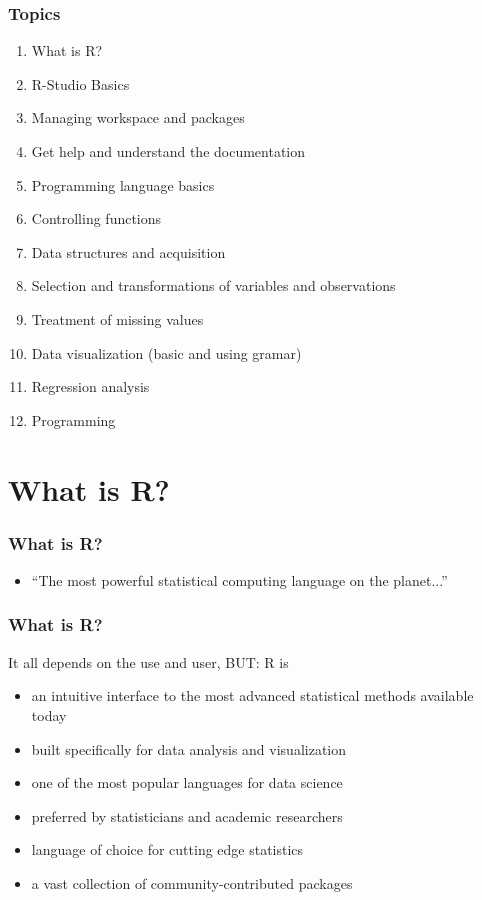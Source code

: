 \documentclass[xcolor={svgnames},10pt,
handout
]{beamer}
\begin{document}
\begin{frame}
\frametitle{Topics}
\begin{enumerate}
\item What is R?
\item R-Studio Basics
\item Managing workspace and packages
\item Get help and understand the documentation
\item Programming language basics
\item Controlling functions
\item Data structures and acquisition
\item Selection and transformations of variables and observations
\item Treatment of missing values
\item Data visualization (basic and using gramar)
\item Regression analysis
\item Programming
\end{enumerate}
\end{frame}


\section{What is R?}

\begin{frame}[standout]
\frametitle{What is R?}
\begin{itemize}
	\item[] \enquote{The most powerful statistical computing language on the planet...}
\end{itemize}
\end{frame}

\begin{frame}
\frametitle{What is R?}
It all depends on the use and user, BUT: R is
\begin{itemize}
\item an intuitive interface to the most advanced statistical methods available today
\item built specifically for data analysis and visualization
\item one of the most popular languages for data science
\item preferred by statisticians and academic researchers
\item language of choice for cutting edge statistics
\item a vast collection of community-contributed packages
\end{itemize}

\end{frame}
\end{document}
